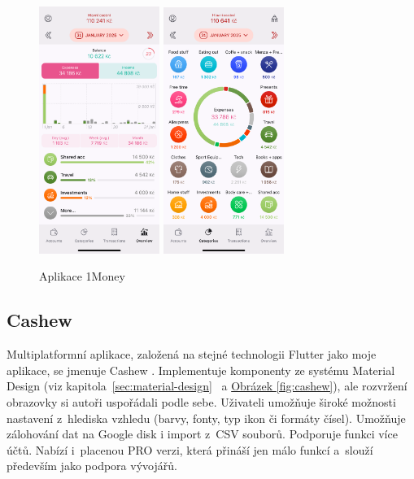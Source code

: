 \documentclass[
  biblatex,
  figures=true,
  tables=false,
  glossaries,
  index
]{kidiplom}
\begin{document}
\begin{figure}
    \centering
    \includegraphics[width=0.35\textwidth]{images/onemoney1.PNG}
    \hspace{10px}
    \includegraphics[width=0.35\textwidth]{images/onemoney2.PNG}
    \caption{Aplikace 1Money}
    \label{fig:1money}
\end{figure}

\subsection{Cashew}
Multiplatformní aplikace, založená na stejné technologii Flutter jako moje aplikace, se jmenuje Cashew \cite{cashew}. Implementuje komponenty ze systému Material Design (viz kapitola~\ref{sec:material-design}~ a \hyperref[fig:cashew]{Obrázek \ref{fig:cashew}}), ale rozvržení obrazovky si autoři uspořádali podle sebe. Uživateli umožňuje široké možnosti nastavení z~hlediska vzhledu (barvy, fonty, typ ikon či formáty čísel). Umožňuje zálohování dat na Google disk i import z~CSV souborů. Podporuje funkci více účtů. Nabízí i~placenou PRO verzi, která přináší jen málo funkcí a~slouží především jako podpora vývojářů.
\end{document}
